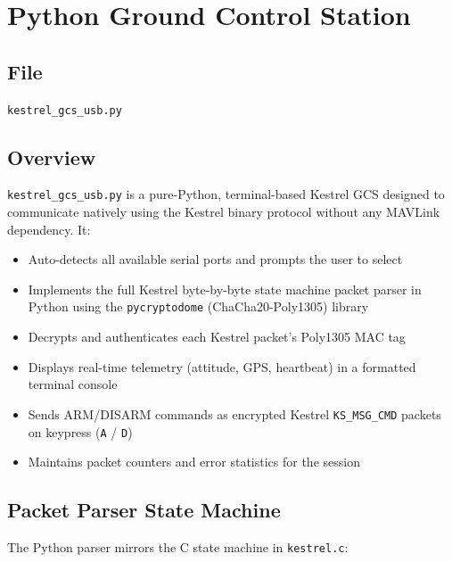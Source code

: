 \documentclass[11pt,a4paper]{article}
\begin{document}
\section{Python Ground Control Station}
\label{sec:gcs}

\subsection{File}
\begin{center}
    \texttt{kestrel\_gcs\_usb.py}
\end{center}

\subsection{Overview}

\texttt{kestrel\_gcs\_usb.py} is a pure-Python, terminal-based Kestrel GCS
designed to communicate natively using the Kestrel binary protocol without
any MAVLink dependency. It:

\begin{itemize}[noitemsep]
    \item Auto-detects all available serial ports and prompts the user to select
    \item Implements the full Kestrel byte-by-byte state machine packet parser
          in Python using the \texttt{pycryptodome} (ChaCha20-Poly1305) library
    \item Decrypts and authenticates each Kestrel packet's Poly1305 MAC tag
    \item Displays real-time telemetry (attitude, GPS, heartbeat) in a formatted
          terminal console
    \item Sends ARM/DISARM commands as encrypted Kestrel \texttt{KS\_MSG\_CMD}
          packets on keypress (\texttt{A} / \texttt{D})
    \item Maintains packet counters and error statistics for the session
\end{itemize}

\subsection{Packet Parser State Machine}

The Python parser mirrors the C state machine in \texttt{kestrel.c}:
\end{document}
